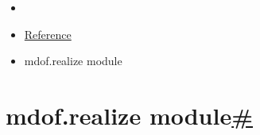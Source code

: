 \hypertarget{rtd-footer-container}{}

\hypertarget{main-content}{}
\begin{itemize}
\tightlist
\item
  \href{../index.html}{\emph{}}
\item
  \href{index.html}{Reference}
\item
  mdof.realize module
\end{itemize}

\hypertarget{searchbox}{}

\hypertarget{module-mdof.realize}{}
\protect\hypertarget{mdof-realize-module}{}{}

\hypertarget{mdof.realize-module}{%
\section{\texorpdfstring{mdof.realize
module\protect\hyperlink{module-mdof.realize}{\#}}{mdof.realize module\#}}\label{mdof.realize-module}}

